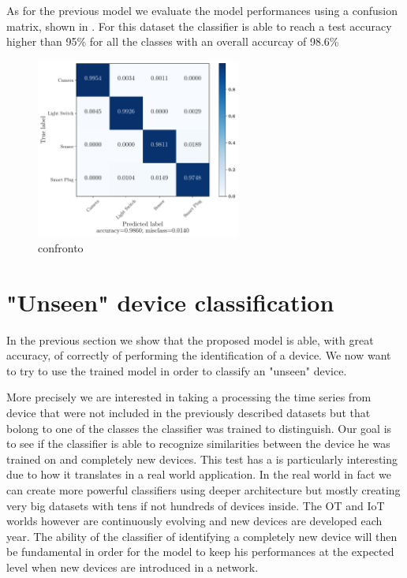 As for the previous model we evaluate the model performances using a confusion matrix, shown in . For this dataset the classifier is able to reach a test accuracy higher than 95\% for all the classes with an overall accurcay of 98.6\%

\begin{figure}[h]
    \centering
        \includegraphics[width=0.6\textwidth]{images/results/IoT_clasf_20210613-175027__type_1branch_no_pool__st_scale_sub__lb_30__act_elu__nf_16__ks_10__nn_50__l2_1e-05__bs_200__ep_300___cm.pdf}
    \caption{confronto}
    \label{fig:iot_results_cm}
\end{figure}



\section{"Unseen" device classification}\label{res_unseen}

In the previous section we show that the proposed model is able, with great accuracy, of correctly of performing the identification of a device. We now want to try to use the trained model in order to classify an "unseen" device.

More precisely we are interested in taking a processing the time series from device that were not included in the previously described datasets but that bolong to one of the classes the classifier was trained to distinguish. Our goal is to see if the classifier is able to recognize similarities between the device he was trained on and completely new devices. This test has a is particularly interesting due to how it translates in a real world application. In the real world in fact we can create more powerful classifiers using deeper architecture but mostly creating very big datasets with tens if not hundreds of devices inside. The OT and IoT worlds however are continuously evolving and new devices are developed each year. The ability of the classifier of identifying a completely new device will then be fundamental in order for the model to keep his performances at the expected level when new devices are introduced in a network. 

